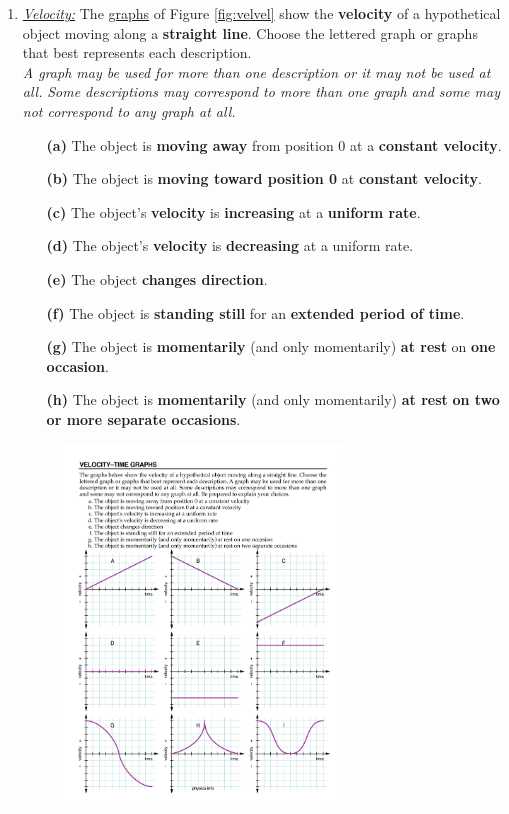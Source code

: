 \documentclass[A4,12pt]{article}
\begin{document}
\begin{enumerate}[label=\bfseries (\arabic*)]
\item \href{https://physics.info/motion-graphs/problems.shtml}{\it Velocity:} The \href{https://isaacphysics.org/questions/stopping_distances?board=5d4ec03d-877c-47a9-bda2-014e9a488970}{graphs} of Figure \ref{fig:velvel} show the {\bf velocity} of a hypothetical object moving along a {\bf straight line}. Choose the lettered graph or graphs that best represents each description. \cite{Elert}\\ 
{\it A graph may be used for more than one description or it may not be used at all.}
{\it Some descriptions may correspond to more than one graph and some may not correspond to any graph at all.}
\begin{itemize}
    \item[\bf (a)] The object is \textbf{moving away} from position 0 at a \textbf{constant velocity}.
    \item[\bf (b)] The object is \textbf{moving toward position 0} at \textbf{constant velocity}.
    \item[\bf (c)] The object's \textbf{velocity} is \textbf{increasing} at a \textbf{uniform rate}.
    \item[\bf (d)] The object's \textbf{velocity} is \textbf{decreasing} at a uniform rate.
    \item[\bf (e)] The object \textbf{changes direction}.
    \item[\bf (f)] The object is \textbf{standing still} for an \textbf{extended period of time}.
    \item[\bf (g)] The object is \textbf{momentarily} (and only momentarily) \textbf{at rest} on \textbf{one occasion}.
    \item[\bf (h)] The object is \textbf{momentarily} (and only momentarily) \textbf{at rest} \textbf{on two or more separate occasions}.
\end{itemize}
\begin{figure}[H]
    \centering
    \includegraphics[width=0.7\textwidth]{choose-velocity.pdf}

\end{figure}
\end{enumerate}
\end{document}
